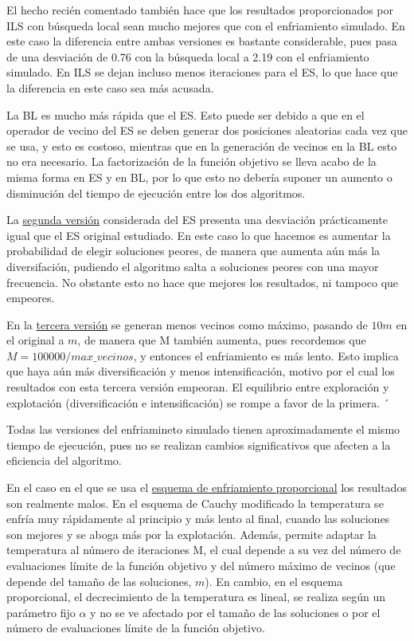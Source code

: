 \documentclass[11pt,a4paper]{article}
\begin{document}
	El hecho recién comentado también hace que los resultados proporcionados por ILS con búsqueda local sean mucho mejores que con el enfriamiento simulado. En este caso la diferencia entre ambas versiones es bastante considerable, pues pasa de una desviación de 0.76 con la búsqueda local a 2.19 con el enfriamiento simulado. En ILS se dejan incluso menos iteraciones para el ES, lo que hace que la diferencia en este caso sea más acusada. 
	
	La BL es mucho más rápida que el ES. Esto puede ser debido a que en el operador de vecino del ES se deben generar dos posiciones aleatorias cada vez que se usa, y esto es costoso, mientras que en la generación de vecinos en la BL esto no era necesario. La factorización de la función objetivo se lleva acabo de la misma forma en ES y en BL, por lo que esto no debería suponer un aumento o disminución del tiempo de ejecución entre los dos algoritmos. 
	
	La \underline{segunda versión} considerada del ES presenta una desviación prácticamente igual que el ES original estudiado. En este caso lo que hacemos es aumentar la probabilidad de elegir soluciones peores, de manera que aumenta aún más la diversifación, pudiendo el algoritmo salta a soluciones peores con una mayor frecuencia. No obstante esto no hace que mejores los resultados, ni tampoco que empeores. 
	
	En la \underline{tercera versión} se generan menos vecinos como máximo, pasando de $ 10m $ en el original a $m$, de manera que M también aumenta, pues recordemos que $M=100000/max\_vecinos$, y entonces el enfriamiento es más lento. Esto implica que haya aún más diversificación y menos intensificación, motivo por el cual los resultados con esta tercera versión empeoran. El equilibrio entre exploración y explotación (diversificación e intensificación) se rompe a favor de la primera. ´
	
	Todas las versiones del enfriamineto simulado tienen aproximadamente el mismo tiempo de ejecución, pues no se realizan cambios significativos que afecten a la eficiencia del algoritmo. 
	
	En el caso en el que se usa el \underline{esquema de enfriamiento proporcional} los resultados son realmente malos. En el esquema de Cauchy modificado la temperatura se enfría muy rápidamente al principio y más lento al final, cuando las soluciones son mejores y se aboga más por la explotación. Además, permite adaptar la temperatura al número de iteraciones M, el cual depende a su vez del número de evaluaciones límite de la función objetivo y del número máximo de vecinos (que depende del tamaño de las soluciones, $ m $). En cambio, en el esquema proporcional, el decrecimiento de la temperatura es lineal, se realiza según un parámetro fijo $\alpha$  y no se ve afectado por el tamaño de las soluciones o por el número de evaluaciones límite de la función objetivo. 
	
\end{document}
